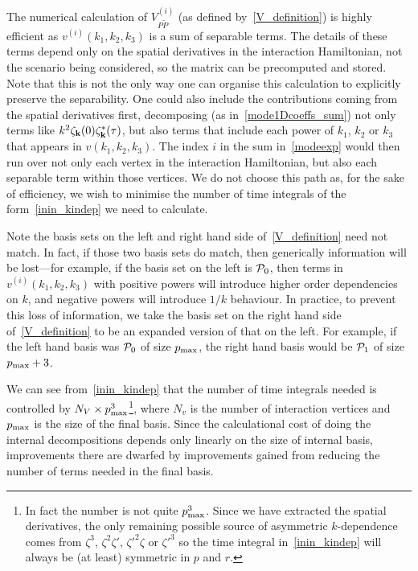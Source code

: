 The numerical calculation of $V^{(i)}_{P\tilde{P}}$ (as defined by~\eqref{V_definition}) is highly efficient as $v^{(i)}(k_1, k_2,k_3)$
is a sum of separable terms. The details of these terms
depend only on the spatial derivatives in the interaction Hamiltonian, not the scenario being
considered, so the matrix can be precomputed and stored.
Note that this is not the only way one can organise this calculation to
explicitly preserve the separability. One could also include the contributions
coming from the spatial derivatives first, decomposing (as in~\eqref{mode1Dcoeffs_sum}) not only terms
like $k^{2} \zeta_{\bf k}(0)\zeta_{\bf k}^*(\tau)$, but also terms that include
each power of $k_1$, $k_2$ or $k_3$ that appears in $v(k_1,k_2,k_3)$. The index $i$
in the sum in~\eqref{modeexp} would then run over not only each vertex in the interaction
Hamiltonian, but also each separable term within those vertices.
We do not choose this path as, for the sake of efficiency, we wish to minimise the
number of time integrals of the form~\eqref{inin_kindep} we need to calculate.


Note the basis sets on the left and right hand side of~\eqref{V_definition}
need not match. In fact, if those two basis sets do match, then generically information
will be lost---for example, if the basis set on the left is $\mathcal{P}_0$, then terms
in $v^{(i)}(k_1,k_2,k_3)$ with positive powers will introduce higher order
dependencies on $k$, and negative powers will introduce $1/k$ behaviour. In
practice, to prevent this loss of information, we take the basis set on the right hand
side of~\eqref{V_definition} to be an expanded version of that on the left. For
example, if the left hand basis was $\mathcal{P}_0$ of size $p_\text{max}$, the right hand basis would
be $\mathcal{P}_1$ of size $p_\text{max}+3$.


We can see from~\eqref{inin_kindep} that the number of time integrals needed is controlled by
$N_V\times p_\text{max}^3$\footnote{In fact the number is not quite $p_\text{max}^3$.
Since we have extracted the spatial derivatives, the only remaining
possible source of asymmetric $k$-dependence
comes from $\zeta^3$, $\zeta^2\zeta'$, $\zeta'^2\zeta$ or $\zeta'^3$
so the time integral in~\eqref{inin_kindep} will always be (at least) symmetric in $p$ and $r$. },
where $N_v$ is the number of interaction vertices
and $p_\text{max}$ is the size of the final basis.
Since the calculational cost of doing the internal decompositions depends only
linearly on the size of internal basis, improvements there are dwarfed by improvements
gained from reducing the number of terms needed in the final basis.


